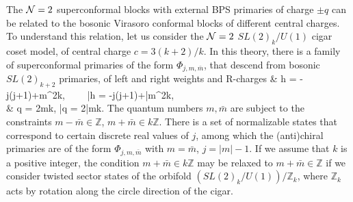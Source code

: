 \documentclass[12pt]{article}
\begin{document}
The ${\mathcal N}=2$ superconformal blocks with external BPS primaries of charge $\pm q$ can be related to the bosonic Virasoro conformal blocks of different central charges.  To understand this relation, let us consider the ${\cal N}=2$ $SL(2)_k/U(1)$ cigar coset model, of central charge $c=3(k+2)/k$. In this theory, there is a family of superconformal primaries of the form $\Phi_{j,m,\bar m}$, that descend from bosonic $SL(2)_{k+2}$ primaries, of left and right weights and R-charges
\ie
& h = {-j(j+1)+m^2\over k},~~~~ \bar h =  {-j(j+1)+\bar m^2\over k},
\\
& q = {2m\over k},\hspace{1.1in} \bar q = {2\bar m\over k}.
\fe
The quantum numbers $m,\bar m$ are subject to the constraints $m- \bar m \in \mathbb{Z}$, $m + \bar m \in k\mathbb{Z}$. There is a set of normalizable states that correspond to certain discrete real values of $j$, among which the (anti)chiral primaries are of the form $\Phi_{j,m,\bar m}$ with $m=\bar m$, $j=|m|-1$. If we assume that $k$ is a positive integer, the condition $m+\bar m\in k\mathbb{Z}$ may be relaxed to $m+\bar m\in\mathbb{Z}$ if we consider twisted sector states of the orbifold $(SL(2)_k/U(1))/\mathbb{Z}_k$, where $\mathbb{Z}_k$ acts by rotation along the circle direction of the cigar.
\end{document}
